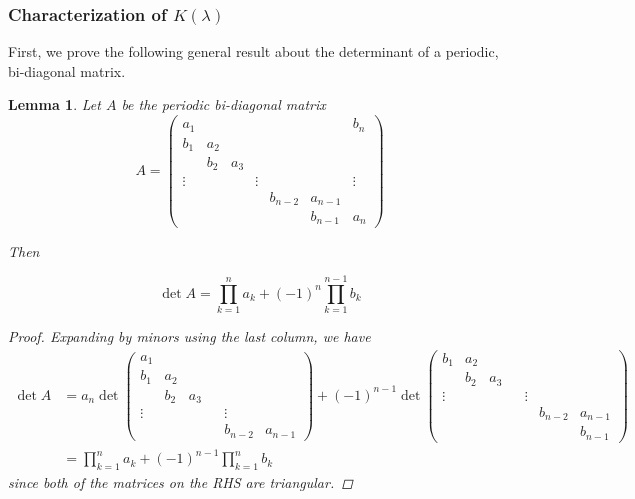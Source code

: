 \documentclass[12pt]{article}
\newtheorem{lemma}{Lemma}
\begin{document}
\subsubsection{Characterization of \texorpdfstring{$K(\lambda)$}{K} }

First, we prove the following general result about the determinant of a periodic, bi-diagonal matrix.


\begin{lemma}\label{bidiag}
Let $A$ be the periodic bi-diagonal matrix
\begin{equation}
A = \begin{pmatrix}
a_1 & & & & & & b_n \\
b_1 & a_2 \\
& b_2 & a_3 \\
\vdots & & & \vdots & &&  \vdots \\
& & & & b_{n-2} & a_{n-1} \\
& & & & & b_{n-1} & a_n
\end{pmatrix}
\end{equation}

Then 

\begin{equation}
\det{A} = \prod_{k = 1}^n a_k + (-1)^n \prod_{k = 1}^{n-1} b_k
\end{equation}

\begin{proof}
Expanding by minors using the last column, we have
\begin{align*}
\det A &= a_n \det
\begin{pmatrix}
a_1 \\
b_1 & a_2 \\
& b_2 & a_3 \\
\vdots & & & & \vdots \\
& & & & b_{n-2} & a_{n-1}
\end{pmatrix}
+ (-1)^{n-1} \det
\begin{pmatrix}
b_1 & a_2 \\
& b_2 & a_3 \\
\vdots & & & & \vdots \\
& & & & & b_{n-2} & a_{n-1} \\
& & & & & & b_{n-1}
\end{pmatrix} \\
&= \prod_{k = 1}^n a_k + (-1)^{n-1} \prod_{k = 1}^n b_k
\end{align*}
since both of the matrices on the RHS are triangular.
\end{proof}
\end{lemma}
\end{document}
